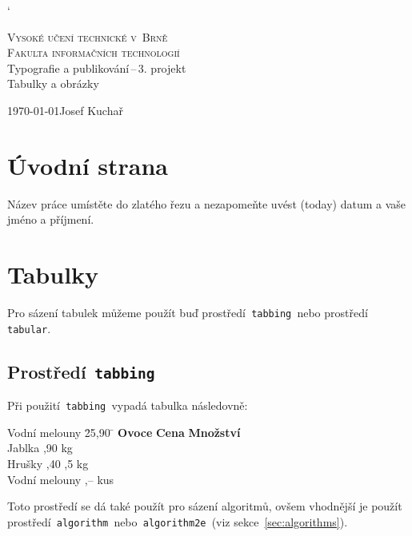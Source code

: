 \documentclass[11pt]{article}
\begin{document}
\catcode`

\begin{titlepage}
    \begin{center}
        \Huge \textsc{Vysoké učení technické v~Brně} \\
        \huge \textsc{Fakulta informačních technologií} \\
        \LARGE{Typografie a publikování\,--\,3. projekt} \\
        \Huge {Tabulky a obrázky}
    \end{center}
    {\Large \today \hfill Josef Kuchař}
    \bigskip
\end{titlepage}

\section{Úvodní strana}
Název práce umístěte do zlatého řezu a nezapomeňte uvést  (today) datum a vaše jméno a příjmení.

\section{Tabulky}
Pro sázení tabulek můžeme použít buď prostředí\texttt{ tabbing }nebo prostředí\texttt{ tabular}.

\subsection{Prostředí\texttt{ tabbing}}
Při použití\texttt{ tabbing }vypadá tabulka následovně:
\begin{tabbing}
    Vodní melouny \quad \= 25,90 \quad \= \kill
    \textbf{Ovoce} \> \textbf{Cena} \> \textbf{Množství} \\
    Jablka ,90  kg \\
    Hrušky ,40 ,5 kg \\
    Vodní melouny ,--  kus \\
\end{tabbing}
Toto prostředí se dá také použít pro sázení algoritmů, ovšem vhodnější je použít prostředí\texttt{ algorithm }nebo\texttt{ algorithm2e }(viz sekce~\ref{sec:algorithms}).
\end{document}

